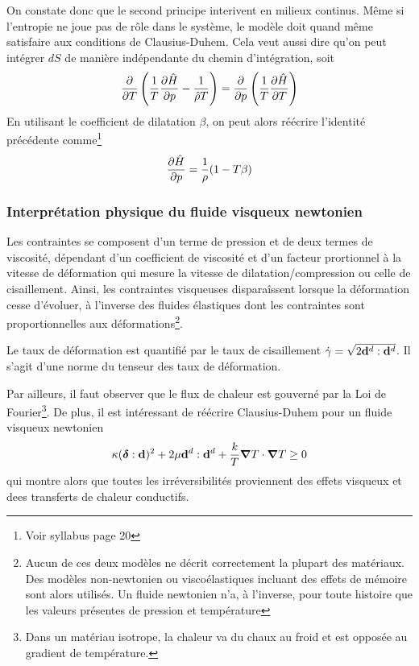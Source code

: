       On constate donc que le second principe interivent en milieux continus. Même si l'entropie ne joue pas de rôle dans le système, le modèle doit quand même satisfaire aux conditions de Clausius-Duhem. Cela veut aussi dire qu'on peut intégrer $dS$ de manière indépendante du chemin d'intégration, soit
      \begin{equation}
        \pdv{}{T}\left(\frac{1}{T}\pdv{\hat{H}}{p} - \frac{1}{\hat{\rho}T}\right) = \pdv{}{p}\left(\frac{1}{T}\pdv{\hat{H}}{T}\right)
      \end{equation}
      En utilisant le coefficient de dilatation $\beta$, on peut alors réécrire l'identité précédente comme\footnote{Voir syllabus page 20}
      \begin{equation}
        \pdv{\hat{H}}{p} = \frac{1}{\rho}(1-T\beta)\label{eq:dHdpbeta}
      \end{equation}

      \subsubsection{Interprétation physique du fluide visqueux newtonien}
        Les contraintes se composent d'un terme de pression et de deux termes de viscosité, dépendant d'un coefficient de viscosité et d'un facteur prortionnel à la vitesse de déformation qui mesure la vitesse de dilatation/compression ou celle de cisaillement. Ainsi, les contraintes visqueuses disparaîssent lorsque la déformation cesse d'évoluer, à l'inverse des fluides élastiques dont les contraintes sont proportionnelles aux déformations\footnote{Aucun de ces deux modèles ne décrit correctement la plupart des matériaux. Des modèles non-newtonien ou viscoélastiques incluant des effets de mémoire sont alors utilisés. Un fluide newtonien n'a, à l'inverse, pour toute histoire que les valeurs présentes de pression et température}.

        Le taux de déformation est quantifié par le taux de cisaillement $\dot{\gamma} = \sqrt{2\vb{d}^d:\vb{d}^d}$. Il s'agit d'une norme du tenseur des taux de déformation.

        Par ailleurs, il faut observer que le flux de chaleur est gouverné par la Loi de Fourier\footnote{Dans un matériau isotrope, la chaleur va du chaux au froid et est opposée au gradient de température.}. De plus, il est intéressant de réécrire Clausius-Duhem pour un fluide visqueux newtonien
        \begin{equation}
          \kappa (\boldsymbol{\delta}:\vb{d})^2 + 2 \mu \vb{d}^d : \vb{d}^d + \frac{k}{T}\grad T \cdot \grad T \geq 0
        \end{equation}
        qui montre alors que toutes les irréversibilités proviennent des effets visqueux et dees transferts de chaleur conductifs.

